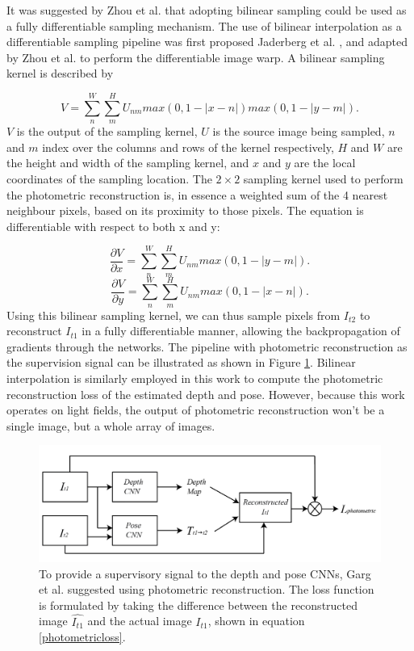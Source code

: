 It was suggested by Zhou et al. \cite{zhou2017unsupervised} that adopting bilinear sampling could be used as a fully differentiable sampling mechanism. The use of bilinear interpolation as a differentiable sampling pipeline was first proposed Jaderberg et al. \cite{jaderberg2015spatialtransformer}, and adapted by Zhou et al. \cite{zhou2017unsupervised} to perform the differentiable image warp. A bilinear sampling kernel is described by 

\begin{equation}
    V = \sum_n^W \sum_m^H U_{nm} max (0, 1-|x - n|) max(0, 1-|y - m|).
\end{equation}
$V$ is the output of the sampling kernel, $U$ is the source image being sampled, $n$ and $m$ index over the columns and rows of the kernel respectively, $H$ and $W$ are the height and width of the sampling kernel, and $x$ and $y$ are the local coordinates of the sampling location. The $2 \times 2$ sampling kernel used to perform the photometric reconstruction is, in essence a weighted sum of the 4 nearest neighbour pixels, based on its proximity to those pixels. The equation is differentiable with respect to both x and y:


\begin{equation}
    \frac{\partial{V}}{\partial{x}} = \sum_n^W \sum_m^H U_{nm} max(0, 1-|y - m|).
\end{equation}
\begin{equation}
    \frac{\partial{V}}{\partial{y}} = \sum_n^W \sum_m^H U_{nm} max(0, 1-|x - n|).
\end{equation}
Using this bilinear sampling kernel, we can thus sample pixels from $I_{t2}$ to reconstruct $I_{t1}$ in a fully differentiable manner, allowing the backpropagation of gradients through the networks. The pipeline with photometric reconstruction as the supervision signal can be illustrated as shown in Figure \ref{supervisedMLCNNS}. Bilinear interpolation is similarly employed in this work to compute the photometric reconstruction loss of the estimated depth and pose. However, because this work operates on light fields, the output of photometric reconstruction won't be a single image, but a whole array of images.


\begin{figure}
    \centering 
    \includegraphics[width=5in]{images/mlpipeline.png}
    \caption[A network architecture for computing photometric loss from depth and pose]{To provide a supervisory signal to the depth and pose CNNs, Garg et al. \cite{garg2016unsupervised} suggested using photometric reconstruction. The loss function is formulated by taking the difference between the reconstructed image $\hat{I_{t1}}$ and the actual image $I_{t1}$, shown in equation \ref{photometricloss}.}
    \label{supervisedMLCNNS}
\end{figure}


